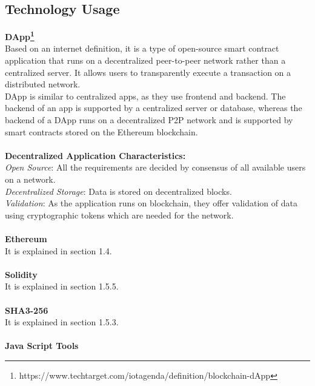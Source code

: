 \subsection{Technology Usage}
\textbf{DApp\footnote{https://www.techtarget.com/iotagenda/definition/blockchain-dApp}} \\
Based on an internet definition, it is a type of open-source smart contract application that runs on a decentralized peer-to-peer network rather than a centralized server. It allows users to transparently execute a transaction on a distributed network. \\
DApp is similar to centralized apps, as they use frontend and backend. The backend of an app is supported by a centralized server or database, whereas the backend of a DApp runs on a decentralized P2P network and is supported by smart contracts stored on the Ethereum blockchain.\\
\\
\textbf{Decentralized Application Characteristics:}\\
	\textit{Open Source}: All the requirements are decided by consensus of all available users on a network.\\
	\textit{Decentralized Storage}: Data is stored on decentralized blocks.\\
	\textit{Validation}: As the application runs on blockchain, they offer validation of data using cryptographic tokens which are needed for the network. \\
 \\
\textbf{Ethereum} \\
It is explained in section 1.4.\\
\\
\textbf{Solidity} \\
It is explained in section 1.5.5.\\
\\
\textbf{SHA3-256} \\It is explained in section 1.5.3.\\
\\
\textbf{Java Script Tools} 
